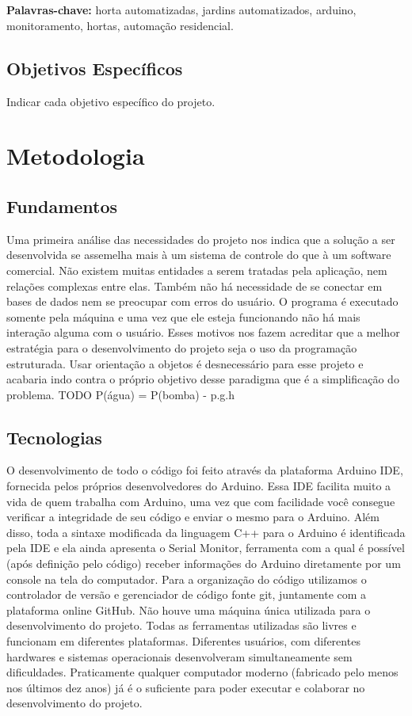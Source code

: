 \documentclass[a4paper,12pt]{article}
\begin{document}
	
  \textbf{\\\\Palavras-chave:} horta automatizadas, jardins automatizados, arduino, monitoramento, hortas, automação residencial.
  
\subsection{Objetivos Específicos}
Indicar cada objetivo específico do projeto.

\newpage
\section{Metodologia}
\subsection{Fundamentos}

Uma primeira análise das necessidades do projeto nos indica que a solução a ser desenvolvida se assemelha mais à um sistema de controle do que à um software comercial. Não existem muitas entidades a serem tratadas pela aplicação, nem relações complexas entre elas. Também não há necessidade de se conectar em bases de dados nem se preocupar com erros do usuário. O programa é executado somente pela máquina e uma vez que ele esteja funcionando não há mais interação alguma com o usuário. Esses motivos nos fazem acreditar que a melhor estratégia para o desenvolvimento do projeto seja o uso da programação estruturada. Usar orientação a objetos é desnecessário para esse projeto e acabaria indo contra o próprio objetivo desse paradigma que é a simplificação do problema. TODO P(água) = P(bomba) - p.g.h
\subsection{Tecnologias}

O desenvolvimento de todo o código foi feito através da plataforma Arduino IDE, fornecida pelos próprios desenvolvedores do Arduino. Essa IDE facilita muito a vida de quem trabalha com Arduino, uma vez que com facilidade você consegue verificar a integridade de seu código e enviar o mesmo para o Arduino. Além disso, toda a sintaxe modificada da linguagem C++ para o Arduino é identificada pela IDE e ela ainda apresenta o Serial Monitor, ferramenta com a qual é possível (após definição pelo código) receber informações do Arduino diretamente por um console na tela do computador. Para a organização do código utilizamos o controlador de versão e gerenciador de código fonte git, juntamente com a plataforma online GitHub. Não houve uma máquina única utilizada para o desenvolvimento do projeto. Todas as ferramentas utilizadas são livres e funcionam em diferentes plataformas. Diferentes usuários, com diferentes hardwares e sistemas operacionais desenvolveram simultaneamente sem dificuldades. Praticamente qualquer computador moderno (fabricado pelo menos nos últimos dez anos) já é o suficiente para poder executar e colaborar no desenvolvimento do projeto. 
\end{document}
